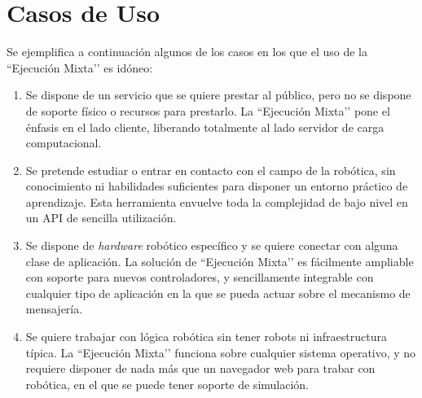 \section{Casos de Uso }
Se ejemplifica a continuación algunos de los casos en los que el uso de la ``Ejecución Mixta’’ es idóneo:
\begin{enumerate}
\item Se dispone de un servicio que se quiere prestar al público, pero no se dispone de soporte físico o recursos para prestarlo. La ``Ejecución Mixta’’ pone el énfasis en el lado cliente, liberando totalmente al lado servidor de carga computacional.
\item Se pretende estudiar o entrar en contacto con el campo de la robótica, sin conocimiento ni habilidades suficientes para disponer un entorno práctico de aprendizaje. Esta herramienta envuelve toda la complejidad de bajo nivel en un API de sencilla utilización.
\item Se dispone de \textit{hardware} robótico específico y se quiere conectar con alguna clase de aplicación. La solución de ``Ejecución Mixta’’ es fácilmente ampliable con soporte para nuevos controladores, y sencillamente integrable con cualquier tipo de aplicación en la que se pueda actuar sobre el mecanismo de mensajería.
\item Se quiere trabajar con lógica robótica sin tener robots ni infraestructura típica. La ``Ejecución Mixta’’ funciona sobre cualquier sistema operativo, y no requiere disponer de nada más que un navegador web para trabar con robótica, en el que se puede tener soporte de simulación.
\end{enumerate}

